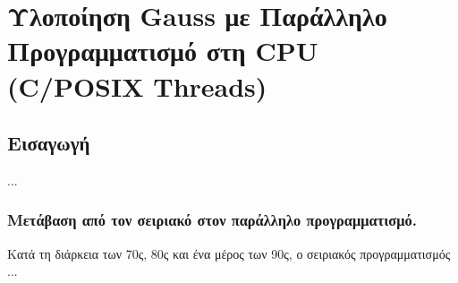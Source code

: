 \section{Υλοποίηση {\lt Gauss} με Παράλληλο \\ Προγραμματισμό στη {\lt CPU \\ (C/POSIX Threads)}}

\subsection{Εισαγωγή}
...


\subsubsection{Μετάβαση από τον σειριακό στον παράλληλο προγραμματισμό.}
    
\noindent
Κατά τη διάρκεια των 70ς, 80ς και ένα μέρος των 90ς, ο σειριακός προγραμματισμός ...
